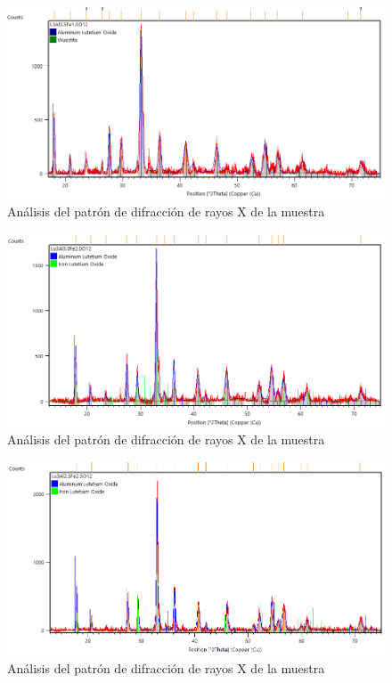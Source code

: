 \begin{appendix}
	\begin{figure}[h]
		\centering%
		\includegraphics[width=\textwidth]{Anexos/x=15.png}%
		\caption{Análisis del patrón de difracción de rayos X de la muestra
		} \label{fig:XpertX15}
	\end{figure}

	\begin{figure}[h]
		\centering%
		\includegraphics[width=\textwidth]{Anexos/x=20.png}%
		\caption{Análisis del patrón de difracción de rayos X de la muestra
		} \label{fig:XpertX20}
	\end{figure}

	\begin{figure}[h]
		\centering%
		\includegraphics[width=\textwidth]{Anexos/x=25.png}%
		\caption{Análisis del patrón de difracción de rayos X de la muestra
		}  \label{fig:XpertX25}
	\end{figure}


\end{appendix}
